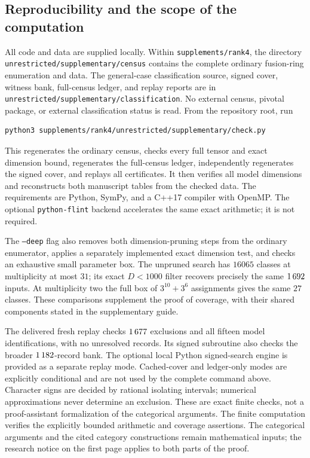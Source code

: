 \subsection{Reproducibility and the scope of the computation}
All code and data are supplied locally. Within \texttt{supplements/rank4}, the directory \texttt{unrestricted/supplementary/census} contains the complete ordinary
fusion-ring enumeration and data. The general-case classification source,
signed cover, witness bank, full-census ledger, and replay reports are in
\nolinkurl{unrestricted/supplementary/classification}. No external census, pivotal package,
or external classification status is read. From the repository root, run
\begin{verbatim}
python3 supplements/rank4/unrestricted/supplementary/check.py
\end{verbatim}
This regenerates the ordinary census, checks every full tensor and exact
dimension bound, regenerates the full-census ledger, independently
regenerates the signed cover, and replays all certificates. It then verifies
all model dimensions and reconstructs both manuscript tables from the
checked data. The requirements are Python, SymPy, and a C++17 compiler
with OpenMP. The optional \texttt{python-flint} backend accelerates the
same exact arithmetic; it is not required.

The \texttt{--deep} flag also removes both dimension-pruning steps from
the ordinary enumerator, applies a separately implemented exact dimension
test, and checks an exhaustive small parameter box. The unpruned search
has $16065$ classes at multiplicity at most $31$; its exact $D<1000$
filter recovers precisely the same $1\,692$ inputs. At multiplicity
two the full box of $3^{10}+3^6$ assignments gives the same $27$ classes.
These comparisons supplement the proof of coverage, with their shared
components stated in the supplementary guide.

The delivered fresh replay checks $1\,677$ exclusions and all
fifteen model identifications, with no unresolved records. Its signed
subroutine also checks the broader $1\,182$-record bank.
The optional local Python signed-search engine is provided as a separate
replay mode. Cached-cover and ledger-only modes are explicitly conditional
and are not used by the complete command above. Character signs are decided
by rational isolating intervals; numerical approximations never determine
an exclusion. These are exact finite checks, not a proof-assistant
formalization of the categorical arguments.
The finite computation verifies the explicitly bounded arithmetic and
coverage assertions. The categorical arguments and the cited category
constructions remain mathematical inputs; the research notice on the
first page applies to both parts of the proof.

